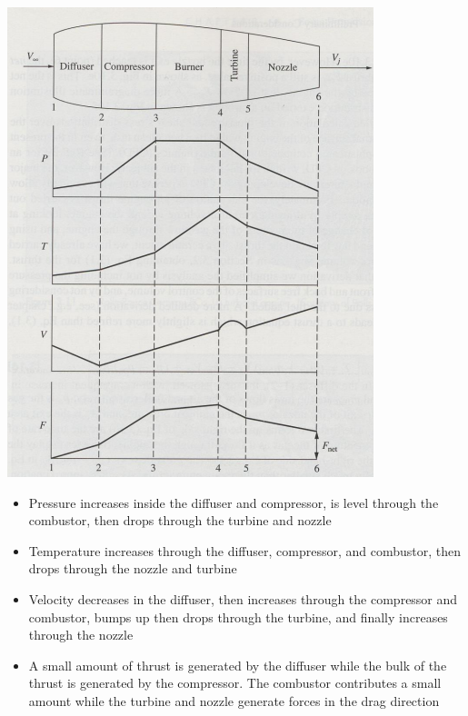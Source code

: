 \documentclass[12pt]{article}
\begin{document}
\begin{itemize}
\begin{minipage}{0.48\textwidth}
	\includegraphics[width=\textwidth]{Graphics/engine_profiles.png}
\end{minipage}
\begin{minipage}{0.48\textwidth}
	\begin{itemize}
	\item Pressure increases inside the diffuser and compressor, is level through the combustor, then drops through the turbine and nozzle
	\item Temperature increases through the diffuser, compressor, and combustor, then drops through the nozzle and turbine
	\item Velocity decreases in the diffuser, then increases through the compressor and combustor, bumps up then drops through the turbine, and finally increases through the nozzle
	\item A small amount of thrust is generated by the diffuser while the bulk of the thrust is generated by the compressor. The combustor contributes a small amount while the turbine and nozzle generate forces in the drag direction
	\end{itemize}
\end{minipage}
\end{itemize}
\vspace{1cm}
\end{document}
